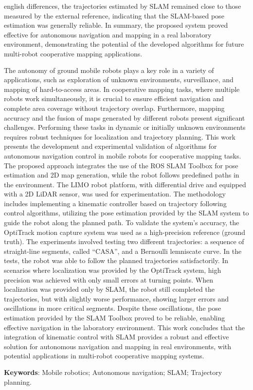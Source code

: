 \begin{resumo}[Abstract]
\begin{otherlanguage*}{english}
differences, the trajectories estimated by SLAM remained close to those measured by the external reference, indicating that the SLAM-based pose estimation was generally reliable. In summary, the proposed system proved effective for autonomous navigation and mapping in a real laboratory environment, demonstrating the potential of the developed algorithms for future multi-robot cooperative mapping applications.

    The autonomy of ground mobile robots plays a key role in a variety of applications, such as exploration of unknown environments, surveillance, and mapping of hard-to-access areas. In cooperative mapping tasks, where multiple robots work simultaneously, it is crucial to ensure efficient navigation and complete area coverage without trajectory overlap. Furthermore, mapping accuracy and the fusion of maps generated by different robots present significant challenges. Performing these tasks in dynamic or initially unknown environments requires robust techniques for localization and trajectory planning. This work presents the development and experimental validation of algorithms for autonomous navigation control in mobile robots for cooperative mapping tasks. The proposed approach integrates the use of the ROS SLAM Toolbox for pose estimation and 2D map generation, while the robot follows predefined paths in the environment. The LIMO robot platform, with differential drive and equipped with a 2D LiDAR sensor, was used for experimentation. The methodology includes implementing a kinematic controller based on trajectory following control algorithms, utilizing the pose estimation provided by the SLAM system to guide the robot along the planned path. To validate the system’s accuracy, the OptiTrack motion capture system was used as a high-precision reference (ground truth). The experiments involved testing two different trajectories: a sequence of straight-line segments, called “CASA”, and a Bernoulli lemniscate curve. In the tests, the robot was able to follow the planned trajectories satisfactorily. In scenarios where localization was provided by the OptiTrack system, high precision was achieved with only small errors at turning points. When localization was provided only by SLAM, the robot still completed the trajectories, but with slightly worse performance, showing larger errors and oscillations in more critical segments. Despite these oscillations, the pose estimation provided by the SLAM Toolbox proved to be reliable, enabling effective navigation in the laboratory environment. This work concludes that the integration of kinematic control with SLAM provides a robust and effective solution for autonomous navigation and mapping in real environments, with potential applications in multi-robot cooperative mapping systems.
   
   \textbf{Keywords}: Mobile robotics; Autonomous navigation; SLAM; Trajectory planning.
 \end{otherlanguage*}
\end{resumo}